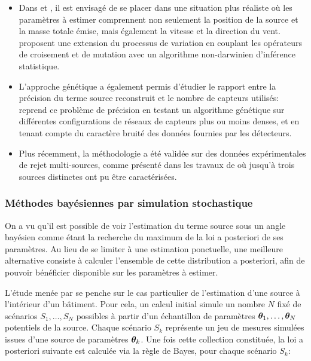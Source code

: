  \begin{itemize}
 	\item Dans \cite{Allen2007} et \cite{Haupt2007}, il est envisagé de se placer dans une situation plus réaliste où les paramètres à estimer comprennent non seulement la position de la source et la masse totale émise, mais également la vitesse et la direction du vent. \cite{Cervone2011} proposent une extension du processus de variation en couplant les opérateurs de croisement et de mutation avec un algorithme non-darwinien d'inférence statistique.
 \item L'approche génétique a également permis d'étudier le rapport entre la précision du terme source reconstruit et le nombre de capteurs utilisés: \cite{Long2010} reprend ce problème de précision en testant un algorithme génétique sur différentes configurations de réseaux de capteurs plus ou moins denses, et en tenant compte du caractère bruité des données fournies par les détecteurs. 
 \item Plus récemment, la méthodologie a été validée sur des données expérimentales de rejet multi-sources, comme présenté dans les travaux de \cite{Cantelli2015} où jusqu'à trois sources distinctes ont pu être caractérisées.\\
 \end{itemize}
 
 \subsubsection{Méthodes bayésiennes par simulation stochastique}
 
 On a vu qu'il est possible de voir l'estimation du terme source sous un angle bayésien  comme étant la recherche du maximum  de la loi a posteriori de ses paramètres. Au lieu de se limiter à une estimation ponctuelle, une meilleure alternative consiste à calculer l'ensemble de cette distribution a posteriori, afin de pouvoir bénéficier  disponible sur les paramètres à estimer. 
 
 L'étude menée par \cite{Sohn2002} se penche sur le cas particulier de l'estimation d'une source à l'intérieur d'un bâtiment. Pour cela, un calcul initial simule un nombre $N$ fixé de scénarios $S_1,\dots,S_N$ possibles à partir d'un échantillon de paramètres ${\bm{\theta}}_1, \dots, {\bm{\theta}}_N$ potentiels de la source. Chaque scénario $S_k$ représente un jeu de mesures simulées issues d'une source de paramètres ${\bm{\theta}}_k$. Une fois cette collection constituée, la loi a posteriori suivante est calculée via la règle de Bayes, pour chaque scénario $S_k$:
 
